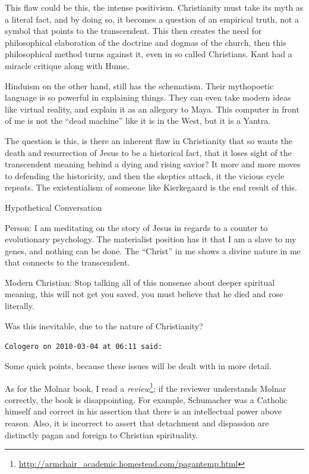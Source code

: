 \begin{footnotesize}
\begin{sffamily}
This flaw could be this, the intense positivism. Christianity must take its myth as a literal fact, and by doing so, it becomes a question of an empirical truth, not a symbol that points to the transcendent. This then creates the need for philosophical elaboration of the doctrine and dogmas of the church, then this philosophical method turns against it, even in so called Christians. Kant had a miracle critique along with Hume.

Hinduism on the other hand, still has the schematism. Their mythopoetic language is so powerful in explaining things. They can even take modern ideas like virtual reality, and explain it as an allegory to Maya. This computer in front of me is not the ``dead machine'' like it is in the West, but it is a Yantra.

The question is this, is there an inherent flaw in Christianity that so wants the death and resurrection of Jesus to be a historical fact, that it loses sight of the transcendent meaning behind a dying and rising savior? It more and more moves to defending the historicity, and then the skeptics attack, it the vicious cycle repeats. The existentialism of someone like Kierkegaard is the end result of this.

Hypothetical Conversation

Person: I am meditating on the story of Jesus in regards to a counter to evolutionary psychology. The materialist position has it that I am a slave to my genes, and nothing can be done. The ``Christ'' in me shows a divine nature in me that connects to the transcendent.

Modern Christian: Stop talking all of this nonsense about deeper spiritual meaning, this will not get you saved, you must believe that he died and rose literally.

Was this inevitable, due to the nature of Christianity?

\hfill

\texttt{Cologero on 2010-03-04 at 06:11 said:}

Some quick points, because these issues will be dealt with in more detail.

As for the Molnar book, I read a \textit{review}\footnote{\url{http://armchair\_academic.homestead.com/pagantemp.html}}; if the reviewer understands Molnar correctly, the book is disappointing. For example, Schumacher was a Catholic himself and correct in his assertion that there is an intellectual power above reason. Also, it is incorrect to assert that detachment and dispassion are distinctly pagan and foreign to Christian spirituality.


\end{sffamily}
\end{footnotesize}
